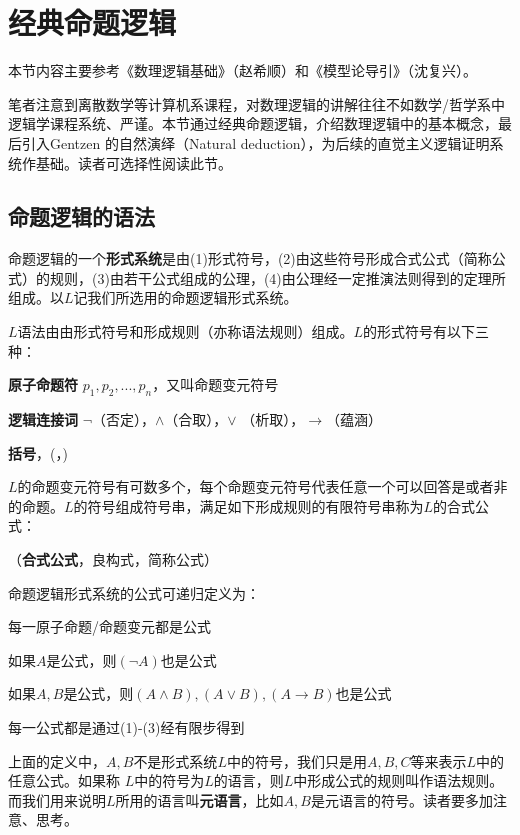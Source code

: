 \section{经典命题逻辑}

本节内容主要参考《数理逻辑基础》（赵希顺）和《模型论导引》（沈复兴）。


笔者注意到离散数学等计算机系课程，对数理逻辑的讲解往往不如数学/哲学系中逻辑学课程系统、严谨。本节通过经典命题逻辑，介绍数理逻辑中的基本概念，最后引入Gentzen 的自然演绎（Natural deduction），为后续的直觉主义逻辑证明系统作基础。读者可选择性阅读此节。


\subsection{命题逻辑的语法}

命题逻辑的一个\textbf{形式系统}是由(1)形式符号，(2)由这些符号形成合式公式（简称公式）的规则，(3)由若干公式组成的公理，(4)由公理经一定推演法则得到的定理所组成。以$L$记我们所选用的命题逻辑形式系统。


$L$语法由由形式符号和形成规则（亦称语法规则）组成。$L$的形式符号有以下三种：

\begin{tightenum}
  \item \textbf{原子命题符} $p_1, p_2,..., p_n$，又叫命题变元符号
  \item \textbf{逻辑连接词} $\neg$（否定），$\land$（合取），$\lor$ （析取），$\to$（蕴涵）
  \item \textbf{括号}，(，)
\end{tightenum}

$L$的命题变元符号有可数多个，每个命题变元符号代表任意一个可以回答是或者非的命题。$L$的符号组成符号串，满足如下形成规则的有限符号串称为$L$的合式公式：

\begin{defn} （\textbf{合式公式}，良构式，简称公式）

命题逻辑形式系统的公式可递归定义为：
\begin{tightenum}
 \item 每一原子命题/命题变元都是公式
 \item 如果$A$是公式，则$(\neg A)$也是公式
 \item 如果$A, B$是公式，则$(A \land B), (A \lor B), (A \to B)$也是公式
 \item 每一公式都是通过(1)-(3)经有限步得到
\end{tightenum}
\end{defn}

\begin{rem}

上面的定义中，$A, B$不是形式系统$L$中的符号，我们只是用$A, B, C$等来表示$L$中的任意公式。如果称
$L$中的符号为$L$的语言，则$L$中形成公式的规则叫作语法规则。而我们用来说明$L$所用的语言叫\textbf{元语言}，比如$A, B$是元语言的符号。读者要多加注意、思考。
\end{rem}


